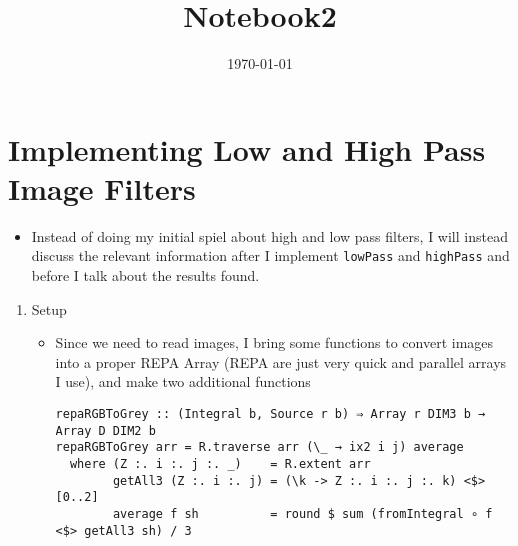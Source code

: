 \documentclass{article}
\date{\today}
\title{Notebook2}
\begin{document}
\maketitle
\tableofcontents

\section{Implementing Low and High Pass Image Filters}
\label{sec-1}
\begin{itemize}
\item Instead of doing my initial spiel about high and low pass filters, I
will instead discuss the relevant information after I implement
\texttt{lowPass} and \texttt{highPass} and before Ι talk about the results found.
\end{itemize}
\begin{enumerate}
\item Setup
\label{sec-1-1}
\begin{itemize}
\item Since we need to read images, Ι bring some functions to convert
images into a proper REPA Array (REPA are just very quick and parallel
arrays Ι use), and make two additional functions
\begin{verbatim}
repaRGBToGrey :: (Integral b, Source r b) ⇒ Array r DIM3 b → Array D DIM2 b
repaRGBToGrey arr = R.traverse arr (\_ → ix2 i j) average
  where (Z :. i :. j :. _)    = R.extent arr
        getAll3 (Z :. i :. j) = (\k -> Z :. i :. j :. k) <$> [0..2]
        average f sh          = round $ sum (fromIntegral ∘ f <$> getAll3 sh) / 3


\end{verbatim}
\end{itemize}
\end{enumerate}
\end{document}

